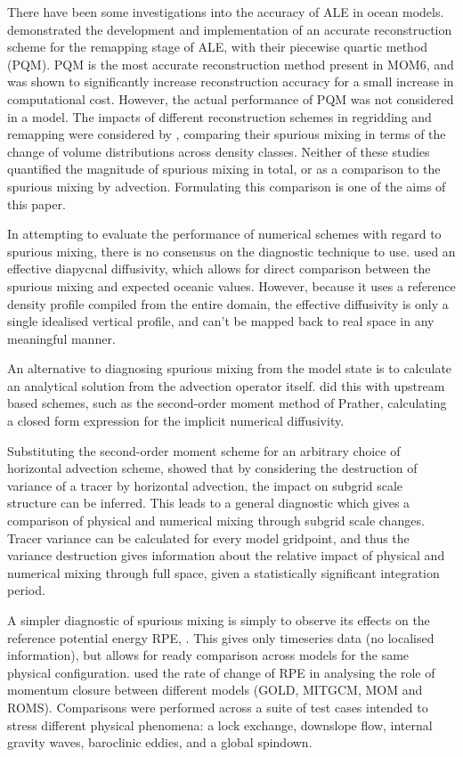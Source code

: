 There have been some investigations into the accuracy of ALE in ocean models. \citet{white08} demonstrated the development and implementation of an accurate reconstruction scheme for the remapping stage of ALE, with their piecewise quartic method (PQM). PQM is the most accurate reconstruction method present in MOM6, and was shown to significantly increase reconstruction accuracy for a small increase in computational cost. However, the actual performance of PQM was not considered in a model. The impacts of different reconstruction schemes in regridding and remapping were considered by \citet{white09}, comparing their spurious mixing in terms of the change of volume distributions across density classes. Neither of these studies quantified the magnitude of spurious mixing in total, or as a comparison to the spurious mixing by advection. Formulating this comparison is one of the aims of this paper.

In attempting to evaluate the performance of numerical schemes with regard to spurious mixing, there is no consensus on the diagnostic technique to use. \citet{griffies00} used an effective diapycnal diffusivity, which allows for direct comparison between the spurious mixing and expected oceanic values. However, because it uses a reference density profile compiled from the entire domain, the effective diffusivity is only a single idealised vertical profile, and can't be mapped back to real space in any meaningful manner.

An alternative to diagnosing spurious mixing from the model state is to calculate an analytical solution from the advection operator itself. \citet{moralesmaqueda06} did this with upstream based schemes, such as the second-order moment method of Prather, calculating a closed form expression for the implicit numerical diffusivity.

Substituting the second-order moment scheme for an arbitrary choice of horizontal advection scheme, \citet{burchard08} showed that by considering the destruction of variance of a tracer by horizontal advection, the impact on subgrid scale structure can be inferred. This leads to a general diagnostic which gives a comparison of physical and numerical mixing through subgrid scale changes. Tracer variance can be calculated for every model gridpoint, and thus the variance destruction gives information about the relative impact of physical and numerical mixing through full space, given a statistically significant integration period.

A simpler diagnostic of spurious mixing is simply to observe its effects on the reference potential energy RPE, \citep{winters95}. This gives only timeseries data (no localised information), but allows for ready comparison across models for the same physical configuration. \citet{ilicak12} used the rate of change of RPE in analysing the role of momentum closure between different models (GOLD, MITGCM, MOM and ROMS). Comparisons were performed across a suite of test cases intended to stress different physical phenomena: a lock exchange, downslope flow, internal gravity waves, baroclinic eddies, and a global spindown.

